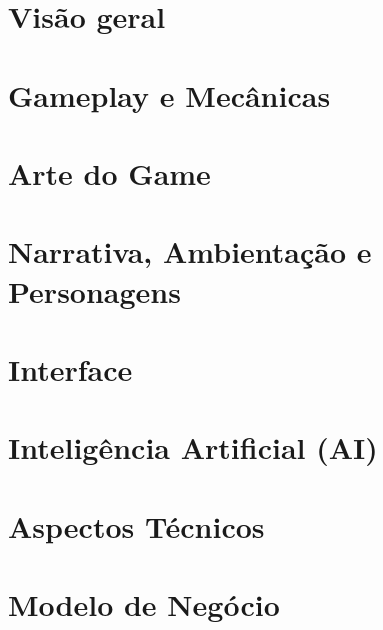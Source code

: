 \chapter{Visão geral}


\chapter{Gameplay e Mecânicas}


\chapter{Arte do Game}


\chapter{Narrativa, Ambientação e Personagens}


\chapter{Interface}


\chapter{Inteligência Artificial (AI)}


\chapter{Aspectos Técnicos}


\chapter{Modelo de Negócio} 

